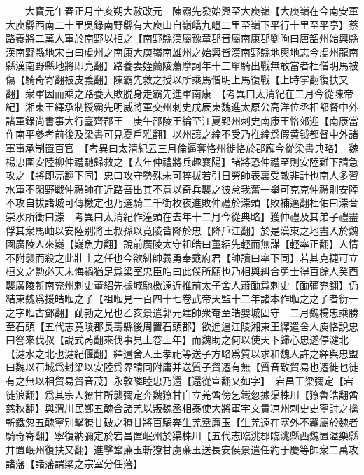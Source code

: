 　　大寶元年春正月辛亥朔大赦改元　陳霸先發始興至大庾嶺【大庾嶺在今南安軍大庾縣西南二十里吳錄南野縣有大庾山自嶺嶠九嶝二里至嶺下平行十里至平亭】蔡路養將二萬人軍於南野以拒之【南野縣漢屬豫章郡晋屬南康郡劉昫曰唐韶州始興縣漢南野縣地宋白曰䖍州之南康大庾嶺南雄州之始興皆漢南野縣地輿地志今䖍州龍南縣漢南野縣地將即亮翻】路養妻姪蘭陵蕭摩訶年十三單騎出戰無敢當者杜僧明馬被傷【騎奇寄翻被皮義翻】陳霸先救之授以所乘馬僧明上馬復戰【上時掌翻復扶又翻】衆軍因而乘之路養大敗脱身走霸先進軍南康　【考異曰太清紀在二月今從陳帝紀】湘東王繹承制授霸先明威將軍交州刺史戊辰東魏進太原公高洋位丞相都督中外諸軍錄尚書事大行臺齊郡王　庚午邵陵王綸至江夏郢州刺史南康王恪郊迎【南康當作南平參考前後及梁書可見夏戶雅翻】以州讓之綸不受乃推綸爲假黄钺都督中外諸軍事承制置百官　【考異曰太清紀云三月倫逼奪恪州徙恪於郡廨今從梁書典略】　魏楊忠圍安陸柳仲禮馳歸救之【去年仲禮將兵趣襄陽】諸將恐仲禮至則安陸難下請急攻之【將即亮翻下同】忠曰攻守勢殊未可猝拔若引日勞師表裏受敵非計也南人多習水軍不閑野戰仲禮師在近路吾出其不意以奇兵襲之彼怠我奮一舉可克克仲禮則安陸不攻自拔諸城可傳檄定也乃選騎二千衘枚夜進敗仲禮於漴頭【敗補邁翻杜佑曰漴音崇水所衝曰漴　考異曰太清紀作潼頭在去年十二月今從典略】獲仲禮及其弟子禮盡俘其衆馬岫以安陸别將王叔孫以竟陵皆降於忠【降戶江翻】於是漢東之地盡入於魏國廣陵人來嶷【嶷魚力翻】說前廣陵太守祖皓曰董紹先輕而無謀【輕率正翻】人情不附襲而殺之此壯士之任也今欲糾帥義勇奉戴府君【帥讀曰率下同】若其克捷可立桓文之勲必天未悔禍猶足爲梁室忠臣皓曰此僕所願也乃相與糾合勇士得百餘人癸酉襲廣陵斬南兖州刺史董紹先據城馳檄遠近推前太子舍人蕭勔爲刺史【勔彌兖翻】仍結東魏爲援皓暅之子【祖暅見一百四十七卷武帝天監十二年諸本作暅之之子者衍一之字暅古鄧翻】勔勃之兄也乙亥景遣郭元建帥衆奄至皓嬰城固守　二月魏楊忠乘勝至石頭【五代志竟陵郡長壽縣後周置石頭郡】欲進逼江陵湘東王繹遣舍人庾恪說忠曰詧來伐叔【說式芮翻來伐事見上卷上年】而魏助之何以使天下歸心忠遂停湕北【湕水之北也湕紀偃翻】繹遣舍人王孝祀等送子方略爲質以求和魏人許之繹與忠盟曰魏以石城爲封梁以安陸爲界請同附庸并送質子貿遷有無【質音致貿易也遷徙也徙有之無以相貿易貿音茂】永敦隣睦忠乃還【還從宣翻又如字】　宕昌王梁彌定【宕徒浪翻】爲其宗人獠甘所襲彌定奔魏獠甘自立羌酋傍乞鐵忽據渠株川【獠魯皓翻酋慈秋翻】與渭川民鄭五醜合諸羌以叛魏丞相泰使大將軍宇文貴凉州刺史史寧討之擒斬鐵忽五醜寧别擊獠甘破之獠甘將百騎奔生羌鞏亷玉【生羌遠在塞外不羈屬於魏者騎奇寄翻】寧復納彌定於宕昌置岷州於渠株川【五代志臨洮郡臨洮縣西魏置溢樂縣并置岷州復扶又翻】進擊鞏亷玉斬獠甘虜亷玉送長安侯景遣任約于慶等帥衆二萬攻諸藩【諸藩謂梁之宗室分任藩】


